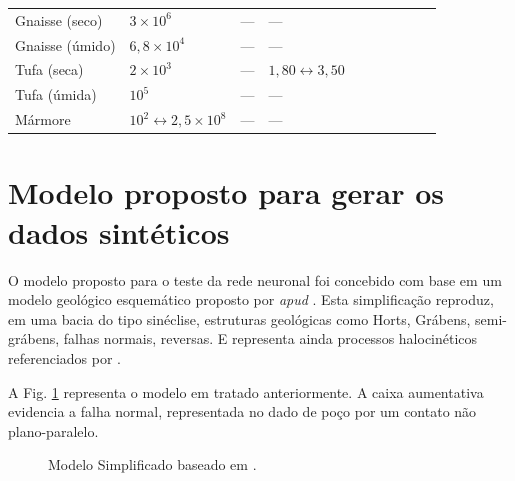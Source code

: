 \begin{table}[H]
\begin{tabular}{@{}llllllllll@{}}
		Gnaisse (seco) & $3\times10^{6}$          &         ---      &     ---       &   \\
		Gnaisse (úmido) &   $6,8\times10^{4}$        &       ---        &      ---      &   \\
		Tufa (seca) &      $2\times10^{3}$     &      ---         &     $1,80\leftrightarrow3,50$       &     \\
		Tufa (úmida) &     $10^{5}$      &     ---          &     ---       &      \\
		Mármore &  $10^{2}\leftrightarrow2,5\times10^{8}$         &       ---        &      ---      &    \\ \bottomrule
	\end{tabular}
\end{table}

 

\section{Modelo proposto para gerar os dados sintéticos}

O modelo proposto para o teste da rede neuronal foi concebido com base em um modelo geológico esquemático proposto por  \citet{Sal2008} \textit{apud} \citep{Eiras1996}. Esta simplificação reproduz, em uma bacia do tipo sinéclise, estruturas geológicas como Horts, Grábens, semi-grábens, falhas normais, reversas. E representa ainda processos halocinéticos referenciados por \cite{Eiras1996}.

A Fig. \ref{modelo} representa o modelo em tratado anteriormente. A caixa aumentativa evidencia a falha normal, representada no dado de poço por um contato não plano-paralelo.

\begin{figure}[H]
	\centering
	\setlength{\fboxsep}{8pt}
	\setlength{\fboxrule}{0.1pt}
	\caption{Modelo Simplificado baseado em \cite{Sal2008}.}
	\label{modelo}
\end{figure}

